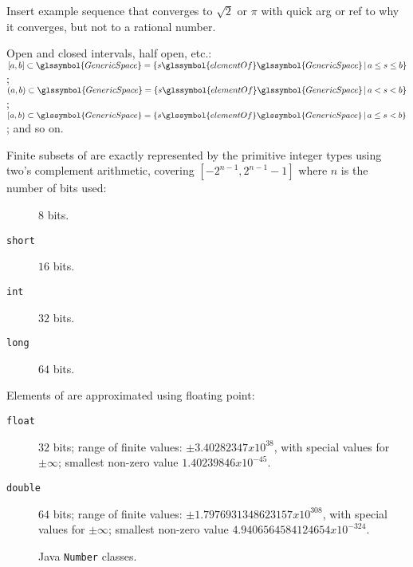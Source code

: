 Insert example sequence that converges to $\sqrt{2}$ or $\pi$
with quick arg or ref to why it converges, but not to a rational
number.


Open and closed intervals, half open, etc.:
$[a,b] \subset \glssymbol{GenericSpace} = 
\SetSpec{s \glssymbol{elementOf} \glssymbol{GenericSpace}}
{a \leq s \leq b}$;
$(a,b) \subset \glssymbol{GenericSpace} = 
\SetSpec{s \glssymbol{elementOf} \glssymbol{GenericSpace}}
{a < s < b}$;
$[a,b) \subset \glssymbol{GenericSpace} = 
\SetSpec{s \glssymbol{elementOf} \glssymbol{GenericSpace}}
{a \leq s < b}$;
and so on.

\lstset{language=Java}


Finite subsets of  are exactly
represented by the primitive integer types using two's complement arithmetic, 
covering $[−2^{n−1}, 2^{n−1} − 1]$ where $n$ is the number of bits used:
\begin{description}
\item[] $8$ bits.
\item[\texttt{short}] $16$ bits.
\item[\texttt{int}] $32$ bits.
\item[\texttt{long}] $64$ bits.
\end{description}

Elements of  are approximated using floating
point:
\begin{description}
\item[\texttt{float}] $32$ bits; range of finite values:
$\pm 3.40282347 x 10^{38}$, with special values for $\pm\infty$;
smallest non-zero value $1.40239846 x 10^{-45}$.
\item[\texttt{double}] $64$ bits;
range of finite values: 
$\pm 1.7976931348623157 x 10^{308}$, with special values for $\pm\infty$;
smallest non-zero value $4.9406564584124654 x 10^{-324}$.
\end{description}


\begin{figure}[htbp]
\centering
\caption{Java \texttt{Number} classes.}
\label{fig:java-number-classes}
\end{figure}

